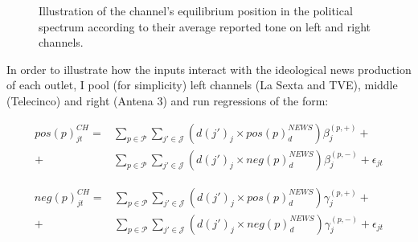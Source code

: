 \documentclass[12pt]{article}
\begin{document}
	\begin{figure}
		\centering
		\caption{Illustration of the channel's equilibrium position in the political spectrum according to their average reported tone on left and right channels. }
		\label{fig:game}
	\end{figure}
	
	In order to illustrate how the inputs interact with the ideological news production of each outlet, I pool (for simplicity) left channels (La Sexta and TVE), middle (Telecinco) and right (Antena 3) and run regressions of the form: 
	
	
	\begin{equation}\label{eq:pred_pos}
		\begin{aligned}
			pos(p)^{CH}_{jt}=& \sum_{p \in \mathcal{P}} \sum_{j' \in \mathcal{J} }  \left(d(j')_j \times pos(p)^{NEWS} _d      \right) \beta_{j}^{(p,+ )}  + \\
			+ &   \sum_{p \in \mathcal{P}} \sum_{j' \in \mathcal{J} }   \left(d(j')_j \times neg(p)^{NEWS} _d      \right) \beta_{j}^{(p,- )} +\epsilon_{jt}
		\end{aligned}	
	\end{equation} 
	
	
	
	\begin{equation}\label{eq:pred_neg}
		\begin{aligned}
			neg(p)^{CH}_{jt}=& \sum_{p \in \mathcal{P}} \sum_{j'\in \mathcal{J} }    \left(d(j')_j \times pos(p)^{NEWS} _d      \right) \gamma_{j}^{(p,+ )} + \\
			+ &   \sum_{p \in \mathcal{P}} \sum_{j' \in \mathcal{J} }   \left(d(j')_j \times neg(p)^{NEWS} _d      \right) \gamma_{j}^{(p,- )} +\epsilon_{jt}
		\end{aligned}
	\end{equation} 
	
\end{document}

